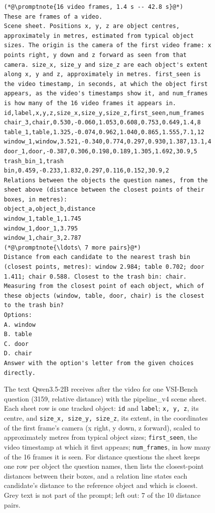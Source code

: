\providecommand{\promptnote}[1]{{\color{gray}\itshape[#1]}}
\begin{figure}[t]
\begin{lstlisting}[style=promptbox]
(*@\promptnote{16 video frames, 1.4 s -- 42.8 s}@*)
These are frames of a video.
Scene sheet. Positions x, y, z are object centres, approximately in metres, estimated from typical object sizes. The origin is the camera of the first video frame: x points right, y down and z forward as seen from that camera. size_x, size_y and size_z are each object's extent along x, y and z, approximately in metres. first_seen is the video timestamp, in seconds, at which the object first appears, as the video's timestamps show it, and num_frames is how many of the 16 video frames it appears in.
id,label,x,y,z,size_x,size_y,size_z,first_seen,num_frames
chair_3,chair,0.530,-0.060,1.053,0.608,0.753,0.649,1.4,8
table_1,table,1.325,-0.074,0.962,1.040,0.865,1.555,7.1,12
window_1,window,3.521,-0.340,0.774,0.297,0.930,1.387,13.1,4
door_1,door,-0.387,0.306,0.198,0.189,1.305,1.692,30.9,5
trash_bin_1,trash bin,0.459,-0.233,1.832,0.297,0.116,0.152,30.9,2
Relations between the objects the question names, from the sheet above (distance between the closest points of their boxes, in metres):
object_a,object_b,distance
window_1,table_1,1.745
window_1,door_1,3.795
window_1,chair_3,2.787
(*@\promptnote{\ldots\ 7 more pairs}@*)
Distance from each candidate to the nearest trash bin (closest points, metres): window 2.984; table 0.702; door 1.411; chair 0.588. Closest to the trash bin: chair.
Measuring from the closest point of each object, which of these objects (window, table, door, chair) is the closest to the trash bin?
Options:
A. window
B. table
C. door
D. chair
Answer with the option's letter from the given choices directly.
\end{lstlisting}
\caption{The text Qwen3.5-2B receives after the video for one VSI-Bench question (3159, relative distance) with the pipeline\_v4 scene sheet. Each sheet row is one tracked object: \texttt{id} and \texttt{label}; \texttt{x, y, z}, its centre, and \texttt{size\_x, size\_y, size\_z}, its extent, in the coordinates of the first frame's camera (x right, y down, z forward), scaled to approximately metres from typical object sizes; \texttt{first\_seen}, the video timestamp at which it first appears; \texttt{num\_frames}, in how many of the 16 frames it is seen. For distance questions the sheet keeps one row per object the question names, then lists the closest-point distances between their boxes, and a relation line states each candidate's distance to the reference object and which is closest. Grey text is not part of the prompt; left out: 7 of the 10 distance pairs.}
\label{fig:prompt-pipeline-v4}
\end{figure}
